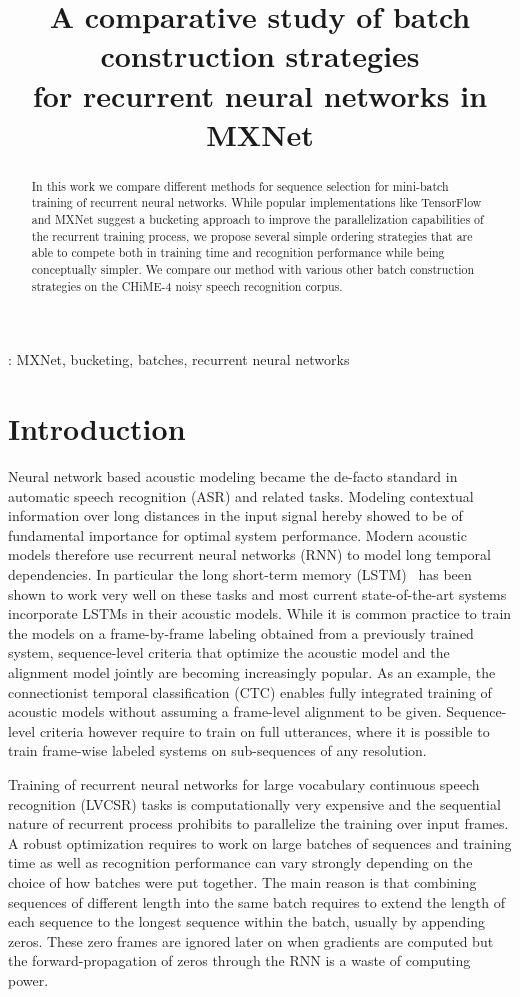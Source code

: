 \documentclass{article}
\title{A comparative study of batch construction strategies \\
	 for recurrent neural networks in MXNet}
\begin{document}
  \maketitle
  \begin{abstract}
  	 In this work we compare different methods for sequence selection for mini-batch training
  	 of recurrent neural networks. While popular implementations like TensorFlow and MXNet suggest 
  	 a bucketing approach to improve the parallelization capabilities of the recurrent training process, 
  	 we propose several simple ordering strategies that are able to compete both in training time and 
  	 recognition performance while being conceptually simpler. We compare our method with various other
  	 batch construction strategies on the CHiME-4 noisy speech recognition corpus. 
  \end{abstract}
  : MXNet, bucketing, batches, recurrent neural networks

  \section{Introduction}
  	Neural network based acoustic modeling became the de-facto standard in automatic speech recognition (ASR)
  	and related tasks. Modeling contextual information over long distances in the input signal hereby showed to 
  	be of fundamental importance for optimal system performance. Modern acoustic models therefore use recurrent 
  	neural networks (RNN) to model long temporal dependencies. In particular the long short-term memory (LSTM)~\cite{hochreiter1997lstm}
  	has been shown to work very well on these tasks and most current state-of-the-art systems incorporate LSTMs
  	in their acoustic models. While it is common practice to train the
  	models on a frame-by-frame labeling obtained from a 
  	previously trained system, sequence-level criteria that optimize the acoustic model and the alignment model jointly
  	are becoming increasingly popular. As an example, the connectionist temporal classification (CTC) \cite{CTC}
  	enables fully integrated training of acoustic models without assuming a frame-level alignment to be given. Sequence-level
  	criteria however require to train on full utterances, where it is possible to train frame-wise labeled systems
  	on sub-sequences of any resolution.
  	
    Training of recurrent neural networks for large vocabulary continuous speech recognition (LVCSR)
    tasks is computationally very expensive and the sequential nature of recurrent process prohibits to
    parallelize the training over input frames. A robust optimization requires to work on large batches of sequences
    and training time as well as recognition performance can vary strongly depending on the choice of how
    batches were put together. The main reason is that combining sequences of different length into the same batch requires 
    to extend the length of each sequence to the longest sequence within the batch, usually by appending zeros. These zero frames 
    are ignored later on when gradients are computed but the forward-propagation of zeros through the RNN is a waste of computing power.
    
\end{document}
